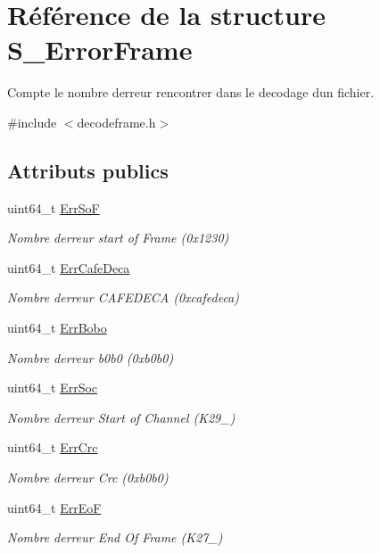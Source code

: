 \hypertarget{struct_s___error_frame}{}\section{Référence de la structure S\+\_\+\+Error\+Frame}
\label{struct_s___error_frame}


Compte le nombre d\textquotesingle{}erreur rencontrer dans le decodage d\textquotesingle{}un fichier.  




{\ttfamily \#include $<$decodeframe.\+h$>$}

\subsection*{Attributs publics}
\begin{DoxyCompactItemize}
\item 
uint64\+\_\+t \hyperlink{struct_s___error_frame_afd3ab1e3e1a636c55f90b4aa13fa0629}{Err\+SoF}
\begin{DoxyCompactList}\small\item\em Nombre d\textquotesingle{}erreur start of Frame (0x1230) \end{DoxyCompactList}\item 
uint64\+\_\+t \hyperlink{struct_s___error_frame_afd8c552c6ca758eb5aedb35a4a7ae611}{Err\+Cafe\+Deca}
\begin{DoxyCompactList}\small\item\em Nombre d\textquotesingle{}erreur C\+A\+F\+E\+D\+E\+CA (0xcafedeca) \end{DoxyCompactList}\item 
uint64\+\_\+t \hyperlink{struct_s___error_frame_a7340625c1dbd480af74d8af9a368430b}{Err\+Bobo}
\begin{DoxyCompactList}\small\item\em Nombre d\textquotesingle{}erreur b0b0 (0xb0b0) \end{DoxyCompactList}\item 
uint64\+\_\+t \hyperlink{struct_s___error_frame_a35a6a18bbb7900d93a401c9ddbceb5c1}{Err\+Soc}
\begin{DoxyCompactList}\small\item\em Nombre d\textquotesingle{}erreur Start of Channel (K29\+\_) \end{DoxyCompactList}\item 
uint64\+\_\+t \hyperlink{struct_s___error_frame_a7b70f13f1ca7e67689d74352af21b69d}{Err\+Crc}
\begin{DoxyCompactList}\small\item\em Nombre d\textquotesingle{}erreur Crc (0xb0b0) \end{DoxyCompactList}\item 
uint64\+\_\+t \hyperlink{struct_s___error_frame_a684de2c10638fec6d7d1895c4bb50f2a}{Err\+EoF}
\begin{DoxyCompactList}\small\item\em Nombre d\textquotesingle{}erreur End Of Frame (K27\+\_) \end{DoxyCompactList}\end{DoxyCompactItemize}


